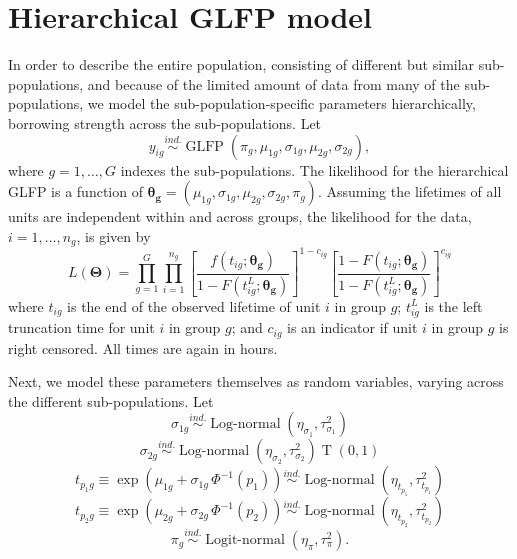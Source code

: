\documentclass[12pt]{article}
\newcommand{\ind}{\stackrel{ind.}{\sim}}
\newcommand{\op}{\operatorname}
\begin{document}
\section{Hierarchical GLFP model}
\label{sec:Hierarchical GLFP model}

In order to describe the entire population, consisting of different but similar sub-populations, and because of the limited amount of data from many of the sub-populations, we model the sub-population-specific parameters hierarchically, borrowing strength across the sub-populations.  Let
\begin{equation}
y_{ig} \ind \op{GLFP}\left( \pi_g, \mu_{1g}, \sigma_{1g}, \mu_{2g}, \sigma_{2g} \right),
\end{equation}
where $g=1,\ldots,G$ indexes the sub-populations.  The likelihood for the hierarchical GLFP is a function of $\bm{\theta_g} = (\mu_{1g}, \sigma_{1g}, \mu_{2g}, \sigma_{2g}, \pi_{g})$.  Assuming the lifetimes of all units are independent within and across groups, the likelihood for the data, $i=1,\dots,n_g$,  is given by
\begin{equation*}
L(\bm{\Theta})= \prod_{g=1}^{G} \prod_{i=1}^{n_{g}} \left[\frac{f(t_{ig};\bm{\theta_g})}{1-F(t_{ig}^L;\bm{\theta_g})}\right]^{1-c_{ig}} \left[ \frac{1-F(t_{ig};\bm{\theta_g})}{1-F(t_{ig}^L;\bm{\theta_g})} \right]^{c_{ig}}
\end{equation*}
where $t_{ig}$ is the end of the observed lifetime of unit $i$ in group $g$; $t_{ig}^L$ is the left truncation time for unit $i$ in group $g$; and $c_{ig}$ is an indicator if unit $i$ in group $g$ is right censored.  All times are again in hours.

Next, we model these parameters themselves as random variables, varying across the different sub-populations.  Let
\begin{equation*}
\sigma_{1g} \ind \op{Log-normal} \left( \eta_{\sigma_1}, \tau^2_{\sigma_1} \right)
\end{equation*}
\begin{equation*}
\sigma_{2g} \ind \op{Log-normal} \left( \eta_{\sigma_2}, \tau^2_{\sigma_2}\right)\op{T}\left(0, 1\right)
\end{equation*}
\begin{equation}
\label{eq:hier-model}
t_{p_{1}g} \equiv \exp\left(\mu_{1g} + \sigma_{1g}\,\Phi^{-1}(p_1)\right)  \ind \op{Log-normal} \left(\eta_{t_{p_1}}, \tau^2_{t_{p_1}}\right)
\end{equation}
\begin{equation*}
t_{p_{2}g} \equiv \exp\left(\mu_{2g} + \sigma_{2g}\,\Phi^{-1}(p_2)\right)  \ind \op{Log-normal} \left(\eta_{t_{p_2}}, \tau^2_{t_{p_2}}\right)
\end{equation*}
\begin{equation*}
\pi_g \ind \op{Logit-normal}(\eta_\pi, \tau^2_\pi).
\end{equation*}
\end{document}
